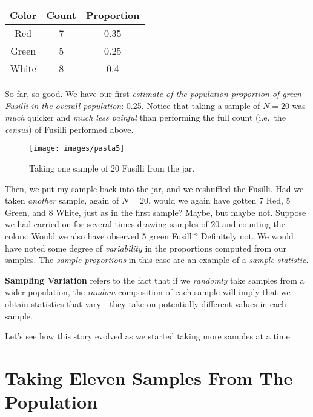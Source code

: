 \documentclass[]{book}
\newenvironment{note}{\begin{tcolorbox}[colback=blue!5!white,colframe=blue!75!black]}{\end{tcolorbox}}
\begin{document}
\begin{longtable}[]{@{}ccc@{}}
\toprule
Color & Count & Proportion\tabularnewline
\midrule
\endhead
Red & 7 & 0.35\tabularnewline
Green & 5 & 0.25\tabularnewline
White & 8 & 0.4\tabularnewline
\bottomrule
\end{longtable}

So far, so good. We have our first \emph{estimate of the population proportion of green Fusilli in the overall population}: 0.25. Notice that taking a sample of \(N=20\) was \emph{much} quicker and \emph{much less painful} than performing the full count (i.e.~the \emph{census}) of Fusilli performed above.

\begin{figure}

{\centering \texttt{[image: images/pasta5]} 

}

\caption{Taking one sample of 20 Fusilli from the jar.}\label{fig:pasta5}
\end{figure}

Then, we put my sample back into the jar, and we reshuffled the Fusilli. Had we taken \emph{another} sample, again of \(N=20\), would we again have gotten 7 Red, 5 Green, and 8 White, just as in the first sample? Maybe, but maybe not. Suppose we had carried on for several times drawing samples of 20 and counting the colors: Would we also have observed 5 green Fusilli? Definitely not. We would have noted some degree of \emph{variability} in the proportions computed from our samples. The \emph{sample proportions} in this case are an example of a \emph{sample statistic}.

\begin{note}
\textbf{Sampling Variation} refers to the fact that if we
\emph{randomly} take samples from a wider population, the \emph{random}
composition of each sample will imply that we obtain statistics that
vary - they take on potentially different values in each sample.
\end{note}

Let's see how this story evolved as we started taking more samples at a time.

\hypertarget{taking-eleven-samples-from-the-population}{%
\section{Taking Eleven Samples From The Population}\label{taking-eleven-samples-from-the-population}}
\end{document}
